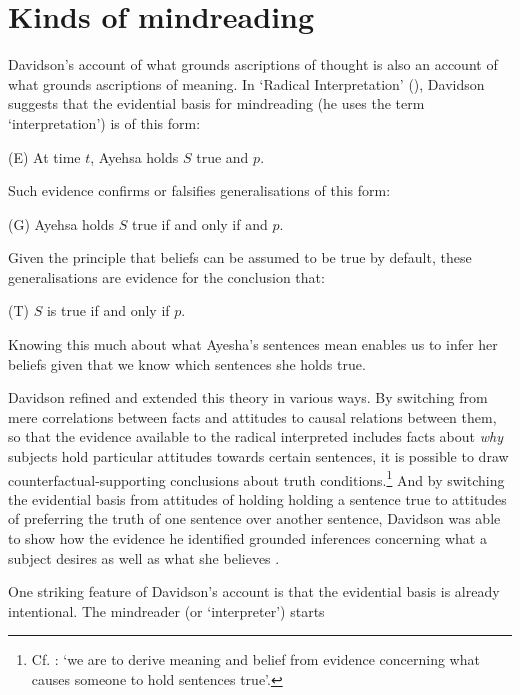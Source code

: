 \documentclass[12pt,letterpaper]{extarticle}
\begin{document}
\section{Kinds of mindreading}
Davidson's account of what grounds ascriptions of thought is also an account of what grounds ascriptions of meaning.
In `Radical Interpretation'
(\citeyear{Davidson:1973jx}), Davidson suggests that the evidential basis for mindreading 
(he uses the term `interpretation')
is of this form:
%
\begin{idescription}
\item[(E)] At time $t$, Ayehsa holds $S$ true and $p$.
\end{idescription}
%
Such evidence confirms or falsifies generalisations of this form:
%
\begin{idescription}
\item[(G)] Ayehsa holds $S$ true if and only if and $p$.
\end{idescription}
%
Given the principle that beliefs can be assumed to be true by default, these generalisations are evidence for the conclusion that:
%
\begin{idescription}
\item[(T)] $S$ is true if and only if $p$.
\end{idescription}
%
Knowing this much about what Ayesha's sentences mean enables us to infer her beliefs given that we know which sentences she holds true.

Davidson refined and extended this theory in various ways.
By switching from mere correlations between facts and attitudes to causal relations between them, so that the evidence available to the radical interpreted includes facts about \emph{why} subjects hold particular attitudes towards certain sentences, 
it is possible to draw counterfactual-supporting conclusions about truth conditions.\footnote{
Cf. \citealp[p.\ 6]{Davidson:1980xp}: `we are to derive meaning and belief from evidence concerning what causes someone to hold sentences true'.
}
%
And by switching the evidential basis from attitudes of holding holding a sentence true to attitudes of preferring the truth of one sentence over another sentence,
Davidson was able to show how the evidence he identified 
grounded inferences concerning what a subject desires as well as what she believes
\citep{Davidson:1980xp}.

One striking feature of Davidson's account is that the evidential basis is already intentional.
The mindreader (or `interpreter') starts 
\end{document}
